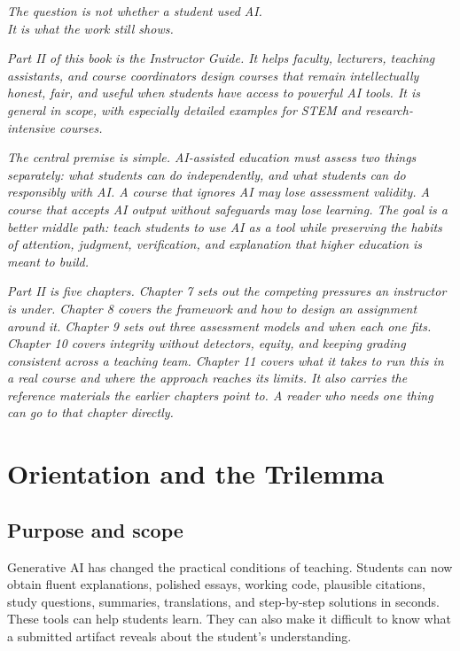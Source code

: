 \documentclass{SIAMbook2023}
\newcommand{\bookepigraph}[1]{%
  \begin{center}%
    \begin{minipage}{0.78\textwidth}%
      \centering\itshape #1%
    \end{minipage}%
  \end{center}%
  \vspace{0.6em}%
}
\begin{document}
\bookepigraph{The question is not whether a student used AI.\\It is what the work still shows.}

\textit{Part II of this book is the Instructor Guide. It helps faculty, lecturers, teaching assistants, and course coordinators design courses that remain intellectually honest, fair, and useful when students have access to powerful AI tools. It is general in scope, with especially detailed examples for STEM and research-intensive courses.}

\textit{The central premise is simple. AI-assisted education must assess two things separately: what students can do independently, and what students can do responsibly with AI. A course that ignores AI may lose assessment validity. A course that accepts AI output without safeguards may lose learning. The goal is a better middle path: teach students to use AI as a tool while preserving the habits of attention, judgment, verification, and explanation that higher education is meant to build.}

\textit{Part II is five chapters. Chapter 7 sets out the competing pressures an instructor is under. Chapter 8 covers the framework and how to design an assignment around it. Chapter 9 sets out three assessment models and when each one fits. Chapter 10 covers integrity without detectors, equity, and keeping grading consistent across a teaching team. Chapter 11 covers what it takes to run this in a real course and where the approach reaches its limits. It also carries the reference materials the earlier chapters point to. A reader who needs one thing can go to that chapter directly.}

\chapter{Orientation and the Trilemma}
\label{i:ch:orientation-and-the-trilemma}%

\section{Purpose and scope}
\label{i:sec:purpose}

Generative AI has changed the practical conditions of teaching. Students can now obtain fluent explanations, polished essays, working code, plausible citations, study questions, summaries, translations, and step-by-step solutions in seconds. These tools can help students learn. They can also make it difficult to know what a submitted artifact reveals about the student's understanding.
\end{document}
